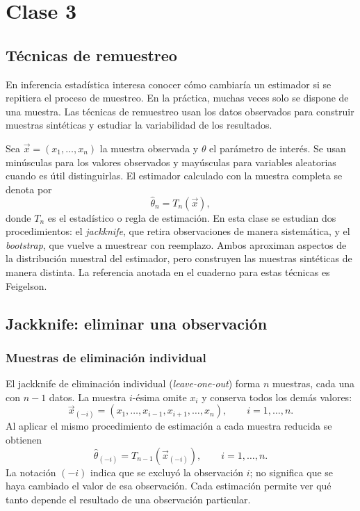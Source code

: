 \section{Clase 3}

\subsection{Técnicas de remuestreo}

En inferencia estadística interesa conocer cómo cambiaría un estimador si se
repitiera el proceso de muestreo. En la práctica, muchas veces solo se dispone
de una muestra. Las técnicas de remuestreo usan los datos observados para
construir muestras sintéticas y estudiar la variabilidad de los resultados.

Sea $\vec{x}=(x_1,\ldots,x_n)$ la muestra observada y $\theta$ el
parámetro de interés. Se usan minúsculas para los valores observados y
mayúsculas para variables aleatorias cuando es útil distinguirlas. El estimador
calculado con la muestra completa se denota por
\[
    \widehat\theta_n=T_n(\vec{x}),
\]
donde $T_n$ es el estadístico o regla de estimación. En esta clase se estudian
dos procedimientos: el \emph{jackknife}, que retira observaciones de manera
sistemática, y el \emph{bootstrap}, que vuelve a muestrear con reemplazo.
Ambos aproximan aspectos de la distribución muestral del estimador, pero
construyen las muestras sintéticas de manera distinta. La referencia anotada
en el cuaderno para estas técnicas es Feigelson.

\subsection{Jackknife: eliminar una observación}

\subsubsection{Muestras de eliminación individual}

El jackknife de eliminación individual (\emph{leave-one-out}) forma $n$
muestras, cada una con $n-1$ datos. La muestra $i$-ésima omite $x_i$ y conserva
todos los demás valores:
\[
    \vec{x}_{(-i)}=(x_1,\ldots,x_{i-1},x_{i+1},\ldots,x_n),
    \qquad i=1,\ldots,n.
\]
Al aplicar el mismo procedimiento de estimación a cada muestra reducida se
obtienen
\[
    \widehat\theta_{(-i)}=T_{n-1}(\vec{x}_{(-i)}),
    \qquad i=1,\ldots,n.
\]
La notación $(-i)$ indica que se excluyó la observación $i$; no significa que
se haya cambiado el valor de esa observación. Cada estimación permite ver qué
tanto depende el resultado de una observación particular.

